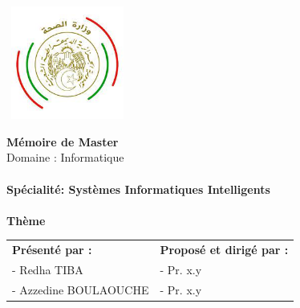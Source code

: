 

\begin{centering}

  \begin{center}
    \normalsize{\radp}       \\
    \normalsize{\ms}         \\
    \normalsize{\dsp{\wil}}  \\
    \normalsize{\isp}        \\
  \end{center}
   
  \begin{center}
    \includegraphics[width=4cm,height=3.7cm]{img/msp.jpg}
  \end{center}
  
  
  
  \begin{center}
      \Huge{\textbf{Mémoire de Master}}\\
      \large{Domaine : Informatique}\\
      \textbf{}\\
      \large{\textbf{Spécialité: Systèmes Informatiques Intelligents}}\\
      \textbf{}\\
      \bigskip
      \vspace*{1cm}
      \normalsize{\textbf{Thème}}
  \end{center}
  
    	      \begin{minipage}{0.9\textwidth}
    	        \begin{center}
    	        \end{center}
    	      \end{minipage}
  \vspace*{1.5cm}
  \begin{table}[h]
    \center
    \begin{tabular}{p{8cm}p{6.5cm}}
      \textbf{Présenté par :}   & \textbf{Proposé et dirigé par :}\\
        - Redha TIBA            & -	Pr. x.y \\
        - Azzedine BOULAOUCHE   & -	Pr. x.y\\
    \end{tabular}
  \end{table}
   

\end{centering}
